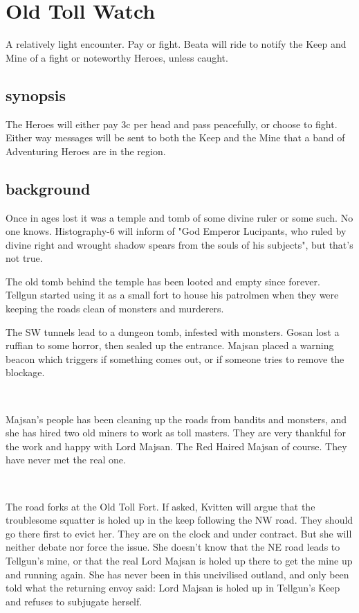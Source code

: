 \section*{Old Toll Watch}
A relatively light encounter. Pay or fight. Beata will ride to notify the Keep and Mine of a fight or noteworthy Heroes, unless caught.


\subsection*{synopsis}
The Heroes will either pay 3c per head and pass peacefully, or choose to fight. Either way messages will be sent to both the Keep and the Mine that a band of Adventuring Heroes are in the region.


\subsection*{background}
Once in ages lost it was a temple and tomb of some divine ruler or some such. No one knows. Histography-6 will inform of "God Emperor Lucipants, who ruled by divine right and wrought shadow spears from the souls of his subjects", but that's not true.

The old tomb behind the temple has been looted and empty since forever. Tellgun started using it as a small fort to house his patrolmen when they were keeping the roads clean of monsters and murderers.

The SW tunnels lead to a dungeon tomb, infested with monsters. Gosan lost a ruffian to some horror, then sealed up the entrance. Majsan placed a warning beacon which triggers if something comes out, or if someone tries to remove the blockage.

\

Majsan's people has been cleaning up the roads from bandits and monsters, and she has hired two old miners to work as toll masters. They are very thankful for the work and happy with Lord Majsan. The Red Haired Majsan of course. They have never met the real one.

\

The road forks at the Old Toll Fort. If asked, Kvitten will argue that the troublesome squatter is holed up in the keep following the NW road. They should go there first to evict her. They are on the clock and under contract. But she will neither debate nor force the issue. She doesn't know that the NE road leads to Tellgun's mine, or that the real Lord Majsan is holed up there to get the mine up and running again. She has never been in this uncivilised outland, and only been told what the returning envoy said: Lord Majsan is holed up in Tellgun's Keep and refuses to subjugate herself.


